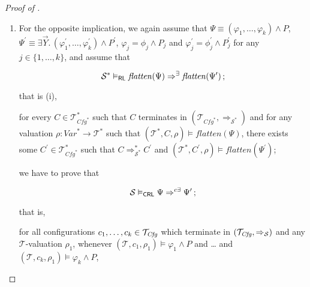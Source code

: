 \begin{proof}[Proof of ]
\begin{enumerate}
    For discharging the (b) and (c) part, we first use
    to change the model element to the appropriate $c^\prime_j$,
    then use 
    to change the valuation to $(\rho_2)^*$ (since the $P$s contain only variables from $\mathit{Var}$),
    then strip the stars using  and notice that we already have appropriate assumptions.
    This concludes the proof.
    \item For the opposite implication, 
    we again assume that $\Psi \equiv (\varphi_1,\ldots,\varphi_k) \land P$,
    $\Psi^\prime \equiv \exists \vec{Y}.\, (\varphi_1^\prime,\ldots,\varphi_k^\prime) \land P^\prime$,
    $\varphi_j = \phi_j \land P_j$ and $\varphi^\prime_j = \phi^\prime_j \land P^\prime_j$ for any $j \in \{ 1, \ldots, k \}$,
    and assume that
    \begin{proofenv}
        \begin{equation*}
            \mathcal{S}^* \vDash_{\mathsf{RL}} \mathit{flatten}(\Psi) \Rightarrow^\exists \mathit{flatten}(\Psi^\prime) \, ;
        \end{equation*}
    \end{proofenv}
    that is (i),
    \begin{proofenv}
        for every $C \in \mathcal{T}^*_{\mathit{Cfg}^*}$ such that $C$ terminates in
        $(\mathcal{T}_{\mathit{Cfg}^*}, \Rightarrow_{\mathcal{S}^*})$
        and for any valuation $\rho : \mathit{Var}^* \to \mathcal{T}^*$ such that
        $(\mathcal{T}^*, C, \rho) \vDash \mathit{flatten}(\Psi)$,
        there exists some $C^\prime \in \mathcal{T}^*_{\mathit{Cfg}^*}$ such that
        $C \Rightarrow_{\mathcal{S}^*}^* C^\prime$
        and $(\mathcal{T}^*, C^\prime, \rho) \vDash \mathit{flatten}(\Psi^\prime)$;
    \end{proofenv}
    we have to prove that
    \begin{proofenv}
        \begin{equation*}
            \mathcal{S} \vDash_{\mathsf{CRL}} \Psi \Rightarrow^{c\exists} \Psi^\prime \, ;
        \end{equation*}
    \end{proofenv}
    that is,
    \begin{proofenv}
        for all configurations $c_1,\ldots,c_k \in \mathcal{T}_{\mathit{Cfg}}$
        which terminate in $(\mathcal{T}_{\mathit{Cfg}}, \Rightarrow_{\mathcal{S}})$
        and any $\mathcal{T}$-valuation $\rho_1$,
        whenever $(\mathcal{T}, c_1,\rho_1) \vDash \varphi_1 \land P$ and \ldots
        and $(\mathcal{T}, c_k,\rho_1) \vDash \varphi_k \land P$,

\end{proofenv}
\end{enumerate}
\end{proof}
